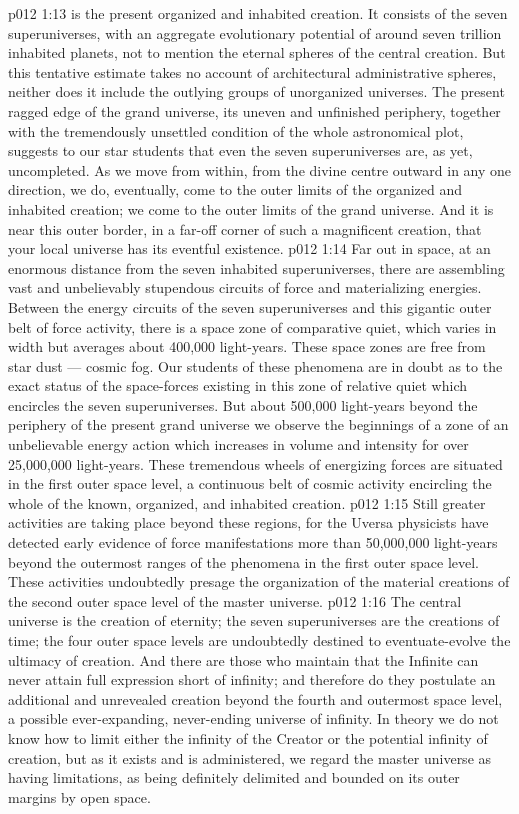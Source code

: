 \vs p012 1:13  is the present organized and inhabited creation. It consists of the seven superuniverses, with an aggregate evolutionary potential of around seven trillion inhabited planets, not to mention the eternal spheres of the central creation. But this tentative estimate takes no account of architectural administrative spheres, neither does it include the outlying groups of unorganized universes. The present ragged edge of the grand universe, its uneven and unfinished periphery, together with the tremendously unsettled condition of the whole astronomical plot, suggests to our star students that even the seven superuniverses are, as yet, uncompleted. As we move from within, from the divine centre outward in any one direction, we do, eventually, come to the outer limits of the organized and inhabited creation; we come to the outer limits of the grand universe. And it is near this outer border, in a far\hyp{}off corner of such a magnificent creation, that your local universe has its eventful existence.
\vs p012 1:14  Far out in space, at an enormous distance from the seven inhabited superuniverses, there are assembling vast and unbelievably stupendous circuits of force and materializing energies. Between the energy circuits of the seven superuniverses and this gigantic outer belt of force activity, there is a space zone of comparative quiet, which varies in width but averages about 400,000 light\hyp{}years. These space zones are free from star dust --- cosmic fog. Our students of these phenomena are in doubt as to the exact status of the space\hyp{}forces existing in this zone of relative quiet which encircles the seven superuniverses. But about 500,000 light\hyp{}years beyond the periphery of the present grand universe we observe the beginnings of a zone of an unbelievable energy action which increases in volume and intensity for over 25,000,000 light\hyp{}years. These tremendous wheels of energizing forces are situated in the first outer space level, a continuous belt of cosmic activity encircling the whole of the known, organized, and inhabited creation.
\vs p012 1:15 Still greater activities are taking place beyond these regions, for the Uversa physicists have detected early evidence of force manifestations more than 50,000,000 light\hyp{}years beyond the outermost ranges of the phenomena in the first outer space level. These activities undoubtedly presage the organization of the material creations of the second outer space level of the master universe.
\vs p012 1:16 The central universe is the creation of eternity; the seven superuniverses are the creations of time; the four outer space levels are undoubtedly destined to eventuate\hyp{}evolve the ultimacy of creation. And there are those who maintain that the Infinite can never attain full expression short of infinity; and therefore do they postulate an additional and unrevealed creation beyond the fourth and outermost space level, a possible ever\hyp{}expanding, never\hyp{}ending universe of infinity. In theory we do not know how to limit either the infinity of the Creator or the potential infinity of creation, but as it exists and is administered, we regard the master universe as having limitations, as being definitely delimited and bounded on its outer margins by open space.
